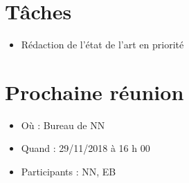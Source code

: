 \documentclass[11pt]{report}
\begin{document}
\section{Tâches}
	\begin{itemize}
		\item Rédaction de l'état de l'art en priorité
	\end{itemize}

		
\section{Prochaine réunion}
	\begin{itemize}
		\item Où : Bureau de NN
		\item Quand : 29/11/2018 à 16 h 00
		\item Participants : NN, EB
	\end{itemize}
\end{document}
